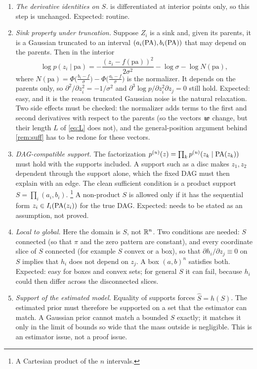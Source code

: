 \begin{enumerate}[label=(R1.\arabic*),leftmargin=3em]
\item\label{item:app:support:R1.1} \emph{The derivative identities on $S$.}  is 
      differentiated at interior points only, so this step is unchanged. Expected: routine.
\item\label{item:app:support:R1.2} \emph{Sink property under truncation.} Suppose $Z_i$ is a sink 
      and, given its parents, it is a Gaussian truncated to an interval $(a_i(\mathrm{PA}),b_i(\mathrm{PA}))$ that 
      may depend on the parents. Then in the interior
      \[
      \log p(z_i\mid \mathrm{pa})=-\frac{(z_i-f(\mathrm{pa}))^2}{2\sigma^2}-\log\sigma-\log 
      N(\mathrm{pa}),
      \]
      where $N(\mathrm{pa})=\Phi\bigl(\tfrac{b_i-f}{\sigma}\bigr)-\Phi\bigl(\tfrac{a_i-f}{\sigma}
      \bigr)$ is the normalizer. It depends on the parents only, so 
      $\partial^2/\partial z_i^2=-1/\sigma^2$ and
      $\partial^3\log p/\partial z_i^2\partial z_j=0$ still hold. Expected: easy, and it is the 
      reason truncated Gaussian noise is the natural relaxation. Two side effects must be checked: 
      the normalizer adds terms to the first and second derivatives with respect to the parents (so 
      the vectors $\boldsymbol{w}$ change, but their length $L$ of \cref{eq:L} does not), and the 
      general-position argument behind \cref{rem:suff} has to be redone for these vectors.
\item\label{item:app:support:R1.3} \emph{DAG-compatible support.} The factorization 
      $p^{(u)}(z)=\prod_k p^{(u)}(z_k\mid\mathrm{PA}(z_k))$ must hold with the supports included. A support 
      such as a disc makes $z_1,z_2$ dependent through the support alone, which the fixed DAG must 
      then explain with an edge. The clean sufficient condition is a product
      support $S=\prod_i(a_i,b_i)$.
      \footnote{A Cartesian product of the $n$ intervals.}
      A non-product $S$ is allowed only if it has the sequential form
      $z_i\in I_i(\mathrm{PA}(z_i))$ for the true DAG. Expected: needs to be stated as an assumption, not 
      proved.
\item\label{item:app:support:R1.4} \emph{Local to global.} Here the domain is $S$, not $\mathbb{R}^n$. Two 
      conditions are needed: $S$ connected (so that $\pi$ and the zero pattern are constant), and 
      every coordinate slice of $S$ connected (for example $S$ convex or a box), so that 
      $\partial h_i/\partial z_j\equiv0$ on $S$ implies that $h_i$ does
      not depend on $z_j$. A box $(a,b)^n$ satisfies both. Expected: easy for boxes and convex sets; 
      for general $S$ it can fail, because $h_i$ could then differ across the disconnected slices.
\item\label{item:app:support:R1.5} \emph{Support of the estimated model.} Equality of supports 
      forces $\hat S=h(S)$. The estimated prior must therefore be supported on a set that the 
      estimator can match. A Gaussian prior cannot match a bounded $S$ exactly; it matches it only 
      in the limit of bounds so wide that the mass outside is
      negligible. This is an estimator issue, not a proof issue.
\end{enumerate}

